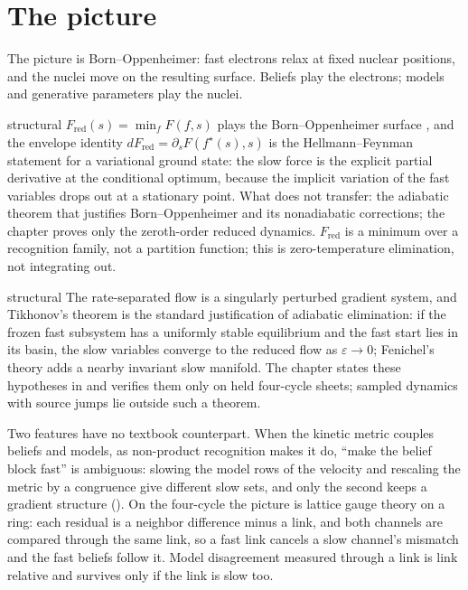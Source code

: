 \section{The picture}
\label{comp:ch08-picture}

The picture is Born--Oppenheimer: fast electrons relax at fixed nuclear positions, and the nuclei move
on the resulting surface. Beliefs play the electrons; models and generative parameters play the
nuclei.

\begin{analogy}{structural}
$F_{\mathrm{red}}(s)=\min_fF(f,s)$ plays the Born--Oppenheimer surface \citep{Born1927}, and the
envelope identity $dF_{\mathrm{red}}=\partial_sF(f^\star(s),s)$ is the Hellmann--Feynman statement for
a variational ground state: the slow force is the explicit partial derivative at the conditional
optimum, because the implicit variation of the fast variables drops out at a stationary point. What
does not transfer: the adiabatic theorem that justifies Born--Oppenheimer and its nonadiabatic
corrections; the chapter proves only the zeroth-order reduced dynamics. $F_{\mathrm{red}}$ is a
minimum over a recognition family, not a partition function; this is zero-temperature elimination,
not integrating out.
\end{analogy}

\begin{analogy}{structural}
The rate-separated flow is a singularly perturbed gradient system, and Tikhonov's theorem
\citep{Tikhonov1952} is the standard justification of adiabatic elimination: if the frozen fast
subsystem has a uniformly stable equilibrium and the fast start lies in its basin, the slow variables
converge to the reduced flow as $\varepsilon\to0$; Fenichel's theory \citep{fenichel1979geometric}
adds a nearby invariant slow manifold. The chapter states these hypotheses in
 and verifies them only on held four-cycle sheets; sampled dynamics with
source jumps lie outside such a theorem.
\end{analogy}

Two features have no textbook counterpart. When the kinetic metric couples beliefs and models, as
non-product recognition makes it do, ``make the belief block fast'' is ambiguous: slowing the model
rows of the velocity and rescaling the metric by a congruence give different slow sets, and only the
second keeps a gradient structure (). On the four-cycle the
picture is lattice gauge theory on a ring: each residual is a neighbor difference minus a link, and
both channels are compared through the same link, so a fast link cancels a slow channel's mismatch
and the fast beliefs follow it. Model disagreement measured through a link is link relative and
survives only if the link is slow too.

